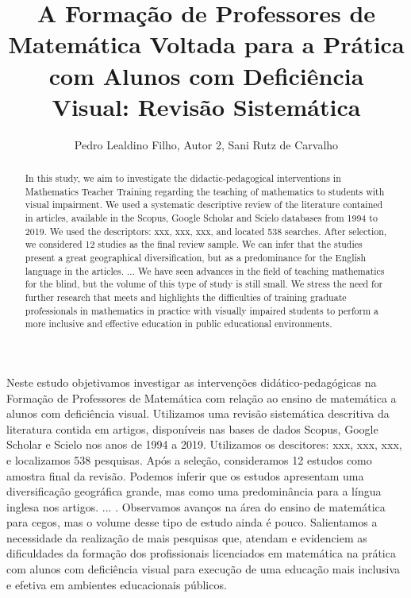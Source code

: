 \documentclass[12pt]{article}
\title{A Formação de Professores de Matemática Voltada para a Prática com Alunos com Deficiência Visual: Revisão Sistemática}
\author{Pedro Lealdino Filho\inst{1}\inst{2}, Autor 2\inst{1}, Sani Rutz de Carvalho\inst{1}}
\begin{document}
\maketitle

\begin{abstract}
In this study, we aim to investigate the didactic-pedagogical interventions in Mathematics Teacher Training regarding the teaching of mathematics to students with visual impairment. We used a systematic descriptive review of the literature contained in articles, available in the Scopus, Google Scholar and Scielo databases from 1994 to 2019. We used the descriptors: xxx, xxx, xxx, and located 538 searches. After selection, we considered 12 studies as the final review sample. We can infer that the studies present a great geographical diversification, but as a predominance for the English language in the articles. ... We have seen advances in the field of teaching mathematics for the blind, but the volume of this type of study is still small. We stress the need for further research that meets and highlights the difficulties of training graduate professionals in mathematics in practice with visually impaired students to perform a more inclusive and effective education in public educational environments.
\end{abstract}

\begin{resumo}
Neste estudo objetivamos investigar as intervenções didático-pedagógicas na Formação de Professores de Matemática com relação ao ensino de matemática a alunos com deficiência visual. Utilizamos uma revisão sistemática descritiva da literatura contida em artigos, disponíveis nas bases de dados Scopus, Google Scholar e Scielo nos anos de 1994 a 2019. Utilizamos os descitores: xxx, xxx, xxx, e localizamos 538 pesquisas. Após a seleção, consideramos 12 estudos como amostra final da revisão. Podemos inferir que os estudos apresentam uma diversificação geográfica grande, mas como uma predominância para a língua inglesa nos artigos. ... . Observamos avanços na área do ensino de matemática para cegos, mas o volume desse tipo de estudo ainda é pouco. Salientamos a necessidade da realização de mais pesquisas que, atendam e evidenciem as dificuldades da formação dos profissionais licenciados em matemática na prática com alunos com deficiência visual para execução de uma educação mais inclusiva e efetiva em ambientes educacionais públicos. 

\end{resumo}
\end{document}
